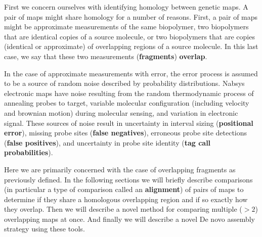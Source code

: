 \documentclass[11pt]{article}
\begin{document}
\par{
First we concern ourselves with identifying homology between genetic maps.  A pair of maps might share homology for a number of reasons.  First, a pair of maps might be approximate measurements of the same biopolymer, two biopolymers that are identical copies of a source molecule, or two biopolymers that are copies (identical or approximate) of overlapping regions of a source molecule.  In this last case, we say that these two measurements (\textbf{fragments}) \textbf{overlap}. 


In the case of approximate measurements with error, the error process is assumed to be a source of random noise described by probability distributions.  Nabsys electronic maps have noise resulting from the random thermodynamic process of annealing probes to target, variable molecular configuration (including velocity and brownian motion) during molecular sensing, and variation in electronic signal.  These sources of noise result in uncertainty in interval sizing (\textbf{positional error}), missing probe sites (\textbf{false negatives}), erroneous probe site detections (\textbf{false positives}), and uncertainty in probe site identity (\textbf{tag call probabilities}).  


Here we are primarily concerned with the case of overlapping fragments as previously defined.  In the following sections we will briefly describe comparisons (in particular a type of comparison called an \textbf{alignment}) of pairs of maps to determine if they share a homologous overlapping region and if so exactly how they overlap.  Then we will describe a novel method for comparing multiple ($>2$) overlapping maps at once.  And finally we will describe a novel De novo assembly strategy using these tools.  

}
\end{document}
